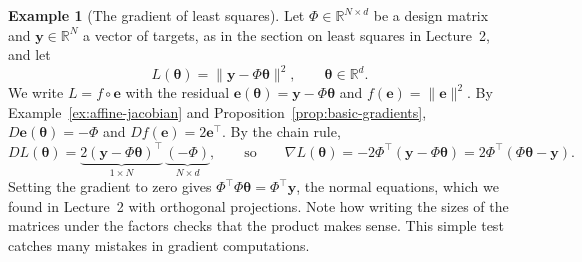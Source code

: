 \documentclass[11pt]{article}
\newcommand{\norm}[1]{\lVert #1 \rVert}
\theoremstyle{definition}
\newtheorem{example}[definition]{Example}
\theoremstyle{plain}
\theoremstyle{remark}
\begin{document}
\begin{example}[The gradient of least squares]\label{ex:ls-gradient}
    Let $\Phi \in \mathbb{R}^{N \times d}$ be a design matrix and $\mathbf{y} \in \mathbb{R}^N$ a vector of targets, as in the section on least squares in Lecture~2, and let
    \[L(\boldsymbol{\theta}) = \norm{\mathbf{y} - \Phi\boldsymbol{\theta}}^2, \qquad \boldsymbol{\theta} \in \mathbb{R}^d.\]
    We write $L = f \circ \mathbf{e}$ with the residual $\mathbf{e}(\boldsymbol{\theta}) = \mathbf{y} - \Phi\boldsymbol{\theta}$ and $f(\mathbf{e}) = \norm{\mathbf{e}}^2$. By Example~\ref{ex:affine-jacobian} and Proposition~\ref{prop:basic-gradients}, $D\mathbf{e}(\boldsymbol{\theta}) = -\Phi$ and $Df(\mathbf{e}) = 2\mathbf{e}^\top$. By the chain rule,
    \[DL(\boldsymbol{\theta}) = \underbrace{2(\mathbf{y} - \Phi\boldsymbol{\theta})^\top}_{1 \times N} \, \underbrace{(-\Phi)}_{N \times d}, \qquad \text{so} \qquad \nabla L(\boldsymbol{\theta}) = -2\Phi^\top(\mathbf{y} - \Phi\boldsymbol{\theta}) = 2\Phi^\top(\Phi\boldsymbol{\theta} - \mathbf{y}).\]
    Setting the gradient to zero gives $\Phi^\top\Phi\boldsymbol{\theta} = \Phi^\top\mathbf{y}$, the normal equations, which we found in Lecture~2 with orthogonal projections. Note how writing the sizes of the matrices under the factors checks that the product makes sense. This simple test catches many mistakes in gradient computations.
\end{example}
\end{document}
